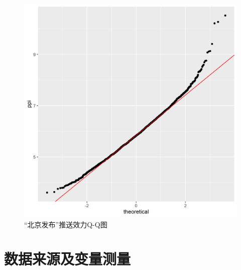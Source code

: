 \documentclass[a4paper,12pt,UTF8]{article}
\begin{document}
    \begin{figure}
      \centering
      \includegraphics[width=0.9\linewidth]{北京发布-qq.png}
      \caption{“北京发布”推送效力Q-Q图}
      \label{fig:beijing-qq}
    \end{figure}

    \section{数据来源及变量测量}
\end{document}
